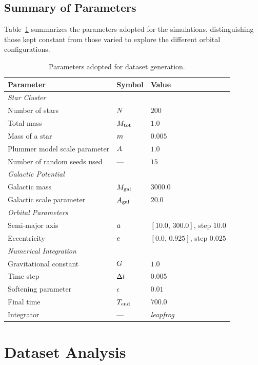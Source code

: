 \subsection{Summary of Parameters}
\label{subsec:riepilogo-parametri}
Table~\ref{tab:parametri-dataset} summarizes the parameters adopted for the simulations, distinguishing those kept constant from those varied to explore the different orbital configurations.
\begin{table}[H]
	\centering
	\caption{Parameters adopted for dataset generation.}
	\label{tab:parametri-dataset}
	\begin{tabular}{lll}
		\hline
		\textbf{Parameter} & \textbf{Symbol} & \textbf{Value} \\
		\hline
		\multicolumn{3}{l}{\textit{Star Cluster}} \\
		Number of stars & $N$ & $200$ \\
		Total mass & $M_{\mathrm{tot}}$ & $1.0$ \\
		Mass of a star & $m$ & $0.005$ \\
		Plummer model scale parameter & $A$ & $1.0$ \\
		Number of random seeds used & --- & $15$ \\
		\hline
		\multicolumn{3}{l}{\textit{Galactic Potential}} \\
		Galactic mass & $M_{\mathrm{gal}}$ & $3000.0$ \\
		Galactic scale parameter & $A_{\mathrm{gal}}$ & $20.0$ \\
		\hline
		\multicolumn{3}{l}{\textit{Orbital Parameters}} \\
		Semi-major axis & $a$ & $[10.0,\,300.0]$, step $10.0$ \\
		Eccentricity & $e$ & $[0.0,\,0.925]$, step $0.025$ \\
		\hline
		\multicolumn{3}{l}{\textit{Numerical Integration}} \\
		Gravitational constant & $G$ & $1.0$ \\
		Time step & $\Delta t$ & $0.005$ \\
		Softening parameter & $\epsilon$ & $0.01$ \\
		Final time & $T_{\mathrm{end}}$ & $700.0$ \\
		Integrator & --- & \emph{leapfrog} \\
		\hline
	\end{tabular}
\end{table}
\section{Dataset Analysis}
\label{sec:analisi-dataset}
